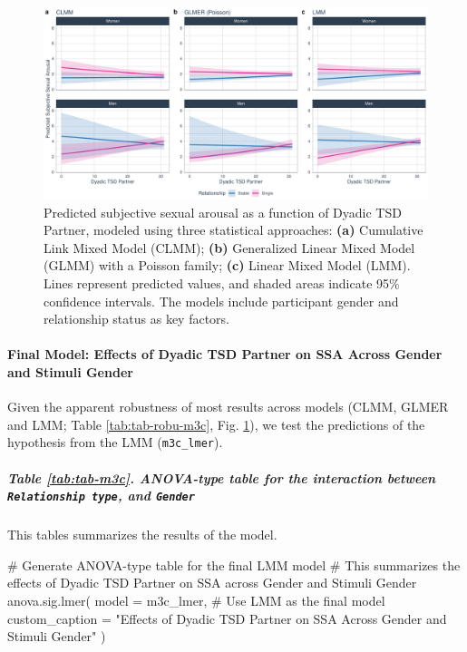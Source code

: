 \documentclass[
  bookmarksnumbered]{article}
\newenvironment{Shaded}{\begin{snugshade}}{\end{snugshade}}
\newcommand{\AttributeTok}[1]{\textcolor[rgb]{0.80,0.80,0.80}{#1}}
\newcommand{\CommentTok}[1]{\textcolor[rgb]{0.50,0.62,0.50}{#1}}
\newcommand{\FunctionTok}[1]{\textcolor[rgb]{0.94,0.94,0.56}{#1}}
\newcommand{\NormalTok}[1]{\textcolor[rgb]{0.80,0.80,0.80}{#1}}
\newcommand{\StringTok}[1]{\textcolor[rgb]{0.80,0.58,0.58}{#1}}
\begin{document}
\begin{figure}
\centering
\includegraphics{Sexual_Desire_Arousal_files/figure-latex/preds-m3c-1.pdf}
\caption{\label{fig:preds-m3c}Predicted subjective sexual arousal as a function of Dyadic TSD Partner, modeled using three statistical approaches: \textbf{(a)} Cumulative Link Mixed Model (CLMM); \textbf{(b)} Generalized Linear Mixed Model (GLMM) with a Poisson family; \textbf{(c)} Linear Mixed Model (LMM). Lines represent predicted values, and shaded areas indicate 95\% confidence intervals. The models include participant gender and relationship status as key factors.}
\end{figure}

\paragraph{Final Model: Effects of Dyadic TSD Partner on SSA Across Gender and Stimuli Gender}\label{final-model-effects-of-dyadic-tsd-partner-on-ssa-across-gender-and-stimuli-gender-1}

Given the apparent robustness of most results across models (CLMM, GLMER and LMM; Table \ref{tab:tab-robu-m3c}, Fig. \ref{fig:preds-m3c}), we test the predictions of the hypothesis from the LMM (\texttt{m3c\_lmer}).

\subparagraph{\texorpdfstring{Table \ref{tab:tab-m3c}. ANOVA-type table for the interaction between \texttt{Relationship\ type}, and \texttt{Gender}}{Table \ref{tab:tab-m3c}. ANOVA-type table for the interaction between Relationship type, and Gender}}\label{table-reftabtab-m3c.-anova-type-table-for-the-interaction-between-relationship-type-and-gender}

This tables summarizes the results of the model.

\begin{Shaded}
\begin{Highlighting}[]
\CommentTok{\# Generate ANOVA{-}type table for the final LMM model}
\CommentTok{\# This summarizes the effects of Dyadic TSD Partner on SSA across Gender and Stimuli Gender}
\FunctionTok{anova.sig.lmer}\NormalTok{(}
  \AttributeTok{model =}\NormalTok{ m3c\_lmer, }\CommentTok{\# Use LMM as the final model}
  \AttributeTok{custom\_caption =} \StringTok{"Effects of Dyadic TSD Partner on SSA Across Gender and Stimuli Gender"}
\NormalTok{)}
\end{Highlighting}
\end{Shaded}
\end{document}
